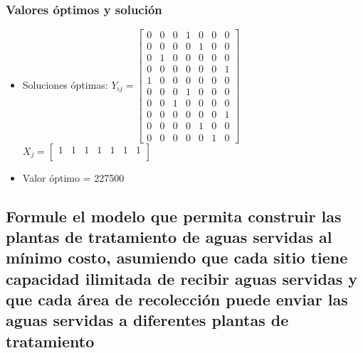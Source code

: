 \documentclass[a4paper,12pt]{article}
\begin{document}
\subsubsection{Valores óptimos y solución}
\begin{itemize}
	\item Soluciones óptimas: $Y_{ij}=
	\begin{bmatrix}
	0 & 0 & 0 & 1 & 0 & 0 & 0\\
	0 & 0 & 0 & 0 & 1 & 0 & 0\\
	0 & 1 & 0 & 0 & 0 & 0 & 0\\
	0 & 0 & 0 & 0 & 0 & 0 & 1\\
	1 & 0 & 0 & 0 & 0 & 0 & 0\\
	0 & 0 & 0 & 1 & 0 & 0 & 0\\
	0 & 0 & 1 & 0 & 0 & 0 & 0\\
	0 & 0 & 0 & 0 & 0 & 0 & 1\\
	0 & 0 & 0 & 0 & 1 & 0 & 0\\
	0 & 0 & 0 & 0 & 0 & 1 & 0
	\end{bmatrix}$
	\\
	$X_{j}=
	\begin{bmatrix}
	1 & 1 & 1 & 1 & 1 & 1 & 1\\
	\end{bmatrix}$
	\item Valor óptimo = 227500
\end{itemize}
\subsection{Formule  el  modelo  que  permita  construir  las  plantas de  tratamiento  de  aguas  servidas  al  mínimo  costo, asumiendo  que  cada  sitio  tiene  capacidad  ilimitada de  recibir  aguas  servidas  y  que  cada  área  de  recolección puede enviar las aguas servidas a diferentes plantas de tratamiento}
\end{document}
